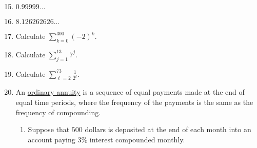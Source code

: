 \documentclass[12pt]{article}
\newif\ifans
\begin{document}

\begin{enumerate}
\setcounter{enumi}{14}

\item $0.99999...$

\ifans{\fbox{$0.99999...=0.9+0.09+0.009+\ldots=\sum_{k=0}^{\infty}0.9\left(\frac{1}{10}\right)^k=\frac{\frac{9}{10}}{1-\frac{1}{10}}=1$}} \fi

\item $8.126262626...$

\ifans{\fbox{\parbox{1\linewidth}
{\begin{flalign*}8.126262626...=8.1+0.026+0.00026+0.0000026+\ldots \\
$=8.1+\sum_{k=0}^{\infty}0.026\left(\frac{1}{100}\right)^k$ \\
$=8.1+\frac{\frac{26}{1000}}{1-\frac{1}{100}}=\frac{81}{10}+\frac{26}{990}=\frac{8045}{990}=\frac{1609}{198}$
\end{flalign*}}}} \fi

\item Calculate $\sum_{k=0}^{300}(-2)^{k}.$

\ifans{\fbox{$\frac{1-(-2)^{301}}{3}=\frac{1+2^{301}}{3}$ }} \fi

\item Calculate $\sum_{j=1}^{13}7^{j}.$

\ifans{\fbox{$-\frac{7}{6}\left(1-7^{13}\right)$; Detailed Solution: \textcolor{blue}{\href{http://www.math.drexel.edu/classes/Calculus/resources/Math123HW/Solutions/123_07_Series_18.pdf}{Here}}}} \fi

\item Calculate $\sum_{\ell=2}^{73}\frac{1}{2^{\ell}}.$

\ifans{\fbox{$\frac{1}{2}\left(1-\frac{1}{2^{72}}\right)$ }} \fi

\item An \underline{ordinary annuity} is a sequence of equal payments made at the end of equal time periods, where the frequency of the payments is the same as the frequency of compounding.  
\begin{enumerate}

\item Suppose that $500$ dollars is deposited at the end of each month into an account paying $3\%$ interest compounded monthly.

\begin{enumerate}


\end{enumerate}
\end{enumerate}
\end{enumerate}
\end{document}
